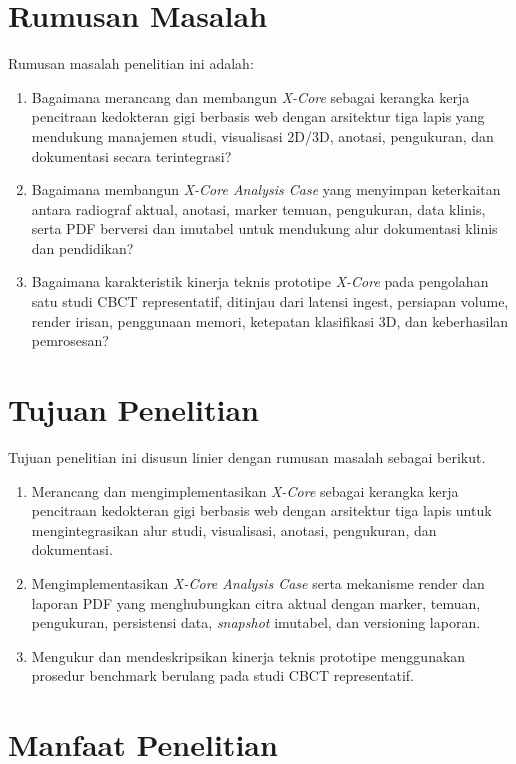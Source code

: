 \documentclass[12pt,a4paper,oneside]{report}
\newcommand{\xcore}{\textit{X-Core}}
\begin{document}
\section{Rumusan Masalah}

Rumusan masalah penelitian ini adalah:
\begin{enumerate}[label=\arabic*.]
  \item Bagaimana merancang dan membangun \xcore{} sebagai kerangka kerja pencitraan kedokteran gigi berbasis web dengan arsitektur tiga lapis yang mendukung manajemen studi, visualisasi 2D/3D, anotasi, pengukuran, dan dokumentasi secara terintegrasi?
  \item Bagaimana membangun \textit{X-Core Analysis Case} yang menyimpan keterkaitan antara radiograf aktual, anotasi, marker temuan, pengukuran, data klinis, serta PDF berversi dan imutabel untuk mendukung alur dokumentasi klinis dan pendidikan?
  \item Bagaimana karakteristik kinerja teknis prototipe \xcore{} pada pengolahan satu studi CBCT representatif, ditinjau dari latensi ingest, persiapan volume, render irisan, penggunaan memori, ketepatan klasifikasi 3D, dan keberhasilan pemrosesan?
\end{enumerate}

\section{Tujuan Penelitian}

Tujuan penelitian ini disusun linier dengan rumusan masalah sebagai berikut.
\begin{enumerate}[label=\arabic*.]
  \item Merancang dan mengimplementasikan \xcore{} sebagai kerangka kerja pencitraan kedokteran gigi berbasis web dengan arsitektur tiga lapis untuk mengintegrasikan alur studi, visualisasi, anotasi, pengukuran, dan dokumentasi.
  \item Mengimplementasikan \textit{X-Core Analysis Case} serta mekanisme render dan laporan PDF yang menghubungkan citra aktual dengan marker, temuan, pengukuran, persistensi data, \textit{snapshot} imutabel, dan versioning laporan.
  \item Mengukur dan mendeskripsikan kinerja teknis prototipe menggunakan prosedur benchmark berulang pada studi CBCT representatif.
\end{enumerate}

\section{Manfaat Penelitian}
\end{document}
